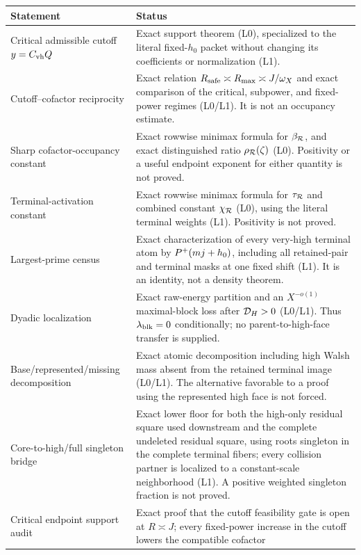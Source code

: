 \begin{center}
\small
\begin{tabular}{>{\raggedright\arraybackslash}p{}
                >{\raggedright\arraybackslash}p{}}
\toprule
Statement & Status \\
\midrule
Critical admissible cutoff \(y=C_{\rm vh}Q\)
& Exact support theorem (L0), specialized to the literal fixed-\(h_0\)
  packet without changing its coefficients or normalization (L1). \\
Cutoff--cofactor reciprocity
& Exact relation
  \(R_{\rm safe}\asymp R_{\rm max}\asymp J/\omega_X\) and exact
  comparison of the critical, subpower, and fixed-power regimes (L0/L1).
  It is not an occupancy estimate. \\
Sharp cofactor-occupancy constant
& Exact rowwise minimax formula for \(\beta_{\mathcal R}\), and exact
  distinguished ratio \(\rho_{\mathcal R}(\zeta)\) (L0).  Positivity or a useful
  endpoint exponent for either quantity is not proved. \\
Terminal-activation constant
& Exact rowwise minimax formula for \(\tau_{\mathcal R}\) and combined constant
  \(\chi_{\mathcal R}\) (L0), using the literal terminal weights (L1).
  Positivity is not proved. \\
Largest-prime census
& Exact characterization of every very-high terminal atom by
  \(P^{+}(mj+h_0)\), including all retained-pair and terminal masks at one
  fixed shift (L1).  It is an identity, not a density theorem. \\
Dyadic localization
& Exact raw-energy partition and an \(X^{-o(1)}\) maximal-block loss after
  \(\mathcal D_H>0\) (L0/L1).  Thus \(\lambda_{\rm blk}=0\) conditionally; no
  parent-to-high-face transfer is supplied. \\
Base/represented/missing decomposition
& Exact atomic decomposition including high Walsh mass absent from the
  retained terminal image (L0/L1).  The alternative favorable to a proof
  using the represented high face is not forced. \\
Core-to-high/full singleton bridge
& Exact lower floor for both the high-only residual square used downstream
  and the complete undeleted residual square, using roots singleton in the
  complete terminal fibers; every collision partner is localized to a
  constant-scale neighborhood (L1).  A positive weighted singleton fraction
  is not proved. \\
Critical endpoint support audit
& Exact proof that the cutoff feasibility gate is open at \(R\asymp J\);
  every fixed-power increase in the cutoff lowers the compatible cofactor

\end{tabular}
\end{center}
